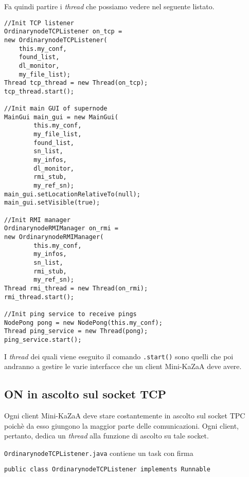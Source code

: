 Fa quindi partire i \emph{thread} che possiamo vedere nel seguente listato.

\begin{lstlisting}
//Init TCP listener
OrdinarynodeTCPListener on_tcp = 
new OrdinarynodeTCPListener(
	this.my_conf, 
	found_list, 
	dl_monitor, 
	my_file_list);
Thread tcp_thread = new Thread(on_tcp);
tcp_thread.start();

//Init main GUI of supernode
MainGui main_gui = new MainGui(
		this.my_conf,
		my_file_list,
		found_list,
		sn_list,
		my_infos,
		dl_monitor,
		rmi_stub,
		my_ref_sn);
main_gui.setLocationRelativeTo(null);
main_gui.setVisible(true);

//Init RMI manager
OrdinarynodeRMIManager on_rmi = 
new OrdinarynodeRMIManager(
		this.my_conf,
		my_infos,
		sn_list,
		rmi_stub,
		my_ref_sn);
Thread rmi_thread = new Thread(on_rmi);
rmi_thread.start();

//Init ping service to receive pings
NodePong pong = new NodePong(this.my_conf);
Thread ping_service = new Thread(pong);
ping_service.start();
\end{lstlisting}
I \emph{thread} dei quali viene eseguito il comando \verb|.start()| sono quelli che poi andranno a gestire le varie interfacce che un client Mini-KaZaA deve avere.

\subsection{ON in ascolto sul socket TCP}
Ogni client Mini-KaZaA deve stare costantemente in ascolto sul socket TPC poichè da esso giungono la maggior parte delle comunicazioni.
Ogni client, pertanto, dedica un \emph{thread} alla funzione di ascolto su tale socket.

\verb|OrdinarynodeTCPListener.java| contiene un task con firma
\begin{verbatim}
public class OrdinarynodeTCPListener implements Runnable
\end{verbatim}

